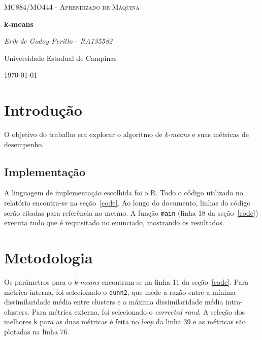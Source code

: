 \documentclass[10pt]{article}
\newcommand{\tit}[1]{\textit{#1}}
\newcommand{\ttt}[1]{\texttt{#1}}
\begin{document}
\begin{titlepage}
	\centering
	{\scshape\Large MC884/MO444 - Aprendizado de Máquina\par}
	\vspace{1.5cm}
    {\huge\bfseries k-means\par}
	\vspace{1cm}
	{\itshape Erik de Godoy Perillo - RA135582\par}
	\vfill
	Universidade Estadual de Campinas
	\vfill
	{\large \today\par}
\end{titlepage}

\newpage

\section{Introdução}
O objetivo do trabalho era explorar o algoritmo de \tit{k-means} e suas
métricas de desempenho.

\subsection{Implementação}
A linguagem de implementação escolhida foi o R.
Todo o código utilizado no relatório encontra-se na seção~\ref{code}.
Ao longo do documento, linhas do código serão citadas para referência no mesmo.
A função \ttt{main} (linha 18 da seção~\ref{code}) executa tudo que é
requisitado no enunciado, mostrando os resultados.

\section{Metodologia}
Os parâmetros para o \tit{k-means} encontram-se na linha 11 da seção~\ref{code}.
Para métrica interna, foi selecionado o \ttt{dunn2}, que mede
a razão entre a mínima dissimilaridade média entre clusters e a máxima
dissimilaridade média intra-clusters.
Para métrica externa, foi selecionado o \tit{corrected rand}.
A seleção dos melhores \ttt{k} para as duas métricas é feita no \tit{loop}
da linha 39 e as métricas são plotadas na linha 76.
\end{document}
